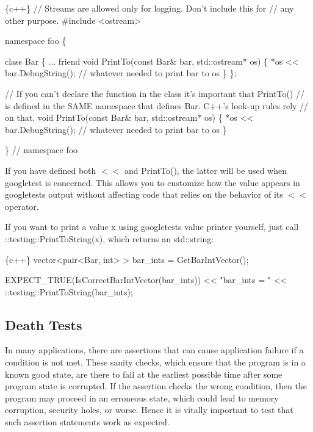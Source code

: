 \begin{DoxyCode}
\{c++\}
// Streams are allowed only for logging.  Don't include this for
// any other purpose.
#include <ostream>

namespace foo \{

class Bar \{
  ...
  friend void PrintTo(const Bar& bar, std::ostream* os) \{
    *os << bar.DebugString();  // whatever needed to print bar to os
  \}
\};

// If you can't declare the function in the class it's important that PrintTo()
// is defined in the SAME namespace that defines Bar.  C++'s look-up rules rely
// on that.
void PrintTo(const Bar& bar, std::ostream* os) \{
  *os << bar.DebugString();  // whatever needed to print bar to os
\}

\}  // namespace foo
\end{DoxyCode}


If you have defined both {\ttfamily $<$$<$} and {\ttfamily Print\+To()}, the latter will be used when googletest is concerned. This allows you to customize how the value appears in googletest\textquotesingle{}s output without affecting code that relies on the behavior of its {\ttfamily $<$$<$} operator.

If you want to print a value {\ttfamily x} using googletest\textquotesingle{}s value printer yourself, just call {\ttfamily \+::testing\+::\+Print\+To\+String(x)}, which returns an {\ttfamily std\+::string}\+:


\begin{DoxyCode}
\{c++\}
vector<pair<Bar, int> > bar\_ints = GetBarIntVector();

EXPECT\_TRUE(IsCorrectBarIntVector(bar\_ints))
    << "bar\_ints = " << ::testing::PrintToString(bar\_ints);
\end{DoxyCode}


\subsection*{Death Tests}

In many applications, there are assertions that can cause application failure if a condition is not met. These sanity checks, which ensure that the program is in a known good state, are there to fail at the earliest possible time after some program state is corrupted. If the assertion checks the wrong condition, then the program may proceed in an erroneous state, which could lead to memory corruption, security holes, or worse. Hence it is vitally important to test that such assertion statements work as expected.

